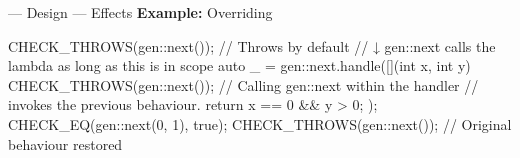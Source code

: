 \begin{frame}[fragile]{\halcheck{} --- Design --- Effects}
  \textbf{Example:} Overriding 
  \begin{cppcode}
    CHECK_THROWS(gen::next()); // Throws by default
    {
      //   ↓ gen::next calls the lambda as long as this is in scope
      auto _ = gen::next.handle([](int x, int y) {
        CHECK_THROWS(gen::next()); // Calling gen::next within the handler
                                   // invokes the previous behaviour.
        return x == 0 && y > 0;
      });
      CHECK_EQ(gen::next(0, 1), true);
    }
    CHECK_THROWS(gen::next()); // Original behaviour restored
  \end{cppcode}
\end{frame}
